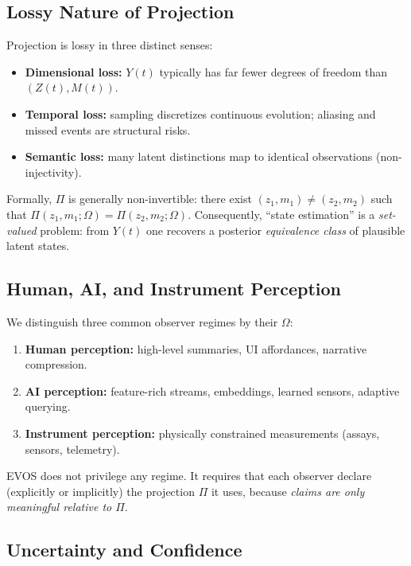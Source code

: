 \documentclass[11pt]{article}
\begin{document}
\subsection{Lossy Nature of Projection}
\label{sec:lossy-projection}

Projection is lossy in three distinct senses:

\begin{itemize}
  \item \textbf{Dimensional loss:} $Y(t)$ typically has far fewer degrees of freedom than $(Z(t),M(t))$.
  \item \textbf{Temporal loss:} sampling discretizes continuous evolution; aliasing and missed events are structural risks.
  \item \textbf{Semantic loss:} many latent distinctions map to identical observations (non-injectivity).
\end{itemize}

Formally, $\Pi$ is generally non-invertible: there exist $(z_1,m_1)\neq(z_2,m_2)$ such that
$\Pi(z_1,m_1;\Omega)=\Pi(z_2,m_2;\Omega)$. Consequently, ``state estimation'' is a \emph{set-valued}
problem: from $Y(t)$ one recovers a posterior \emph{equivalence class} of plausible latent states.

\subsection{Human, AI, and Instrument Perception}
\label{sec:perception}

We distinguish three common observer regimes by their $\Omega$:

\begin{enumerate}
  \item \textbf{Human perception:} high-level summaries, UI affordances, narrative compression.
  \item \textbf{AI perception:} feature-rich streams, embeddings, learned sensors, adaptive querying.
  \item \textbf{Instrument perception:} physically constrained measurements (assays, sensors, telemetry).
\end{enumerate}

EVOS does not privilege any regime. It requires that each observer declare (explicitly or implicitly)
the projection $\Pi$ it uses, because \emph{claims are only meaningful relative to $\Pi$}.

\subsection{Uncertainty and Confidence}
\label{sec:uncertainty}
\end{document}
